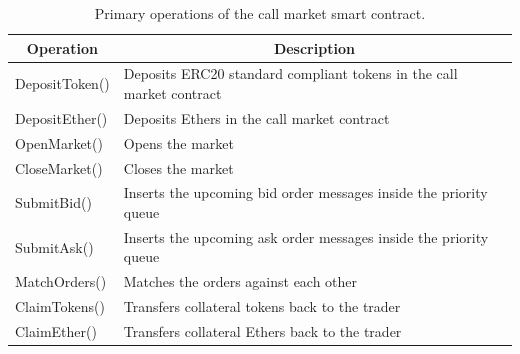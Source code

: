 \begin{table}[t]
\begin{tabular}{|l|l|}
\hline
\multicolumn{1}{|c|}{\textbf{Operation}} & \multicolumn{1}{c|}{\textbf{Description}}                            			\\ \hline

	DepositToken()                           & Deposits ERC20 standard compliant tokens in the call market contract \\ \hline
	DepositEther()                           	& Deposits Ethers in the call market contract                         			 \\ \hline
	OpenMarket()                             & Opens the market                                                    					 \\ \hline
	CloseMarket()                            & Closes the market                                                    					\\ \hline
	SubmitBid()                              & Inserts the upcoming bid order messages inside the priority queue    \\ \hline
	SubmitAsk()                              & Inserts the upcoming ask order messages inside the priority queue    \\ \hline
	MatchOrders()                           & Matches the orders against each other                                			\\ \hline
	ClaimTokens()                           & Transfers collateral tokens back to the trader                       			\\ \hline
	ClaimEther()                             & Transfers collateral Ethers back to the trader                       			\\ \hline
\end{tabular}
\caption{\footnotesize{Primary operations of the call market smart contract.}
\label{tab:callmarket_functions}}
\end{table}

